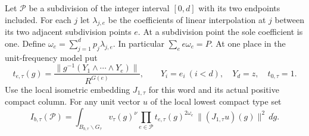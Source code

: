 \documentclass[a4paper,11pt]{article}
\theoremstyle{definition}
\theoremstyle{remark}
\numberwithin{equation}{section}
\begin{document}
Let \(\mathcal P\) be a subdivision of the integer interval
\([0,d]\) with its two endpoints included. For each \(j\) let
\(\lambda_{j,e}\) be the coefficients of linear interpolation at
\(j\) between its two adjacent subdivision points \(e\).
At a subdivision point the sole coefficient is one. Define
\(\omega_e=\sum_{j=1}^d p_j\lambda_{j,e}\). In particular
\(\sum_e e\omega_e=P\). At one place in the unit-frequency
model put
\[
 t_{e,\tau}(g)=
 \frac{\|g^{-1}(Y_1\wedge\cdots\wedge Y_e)\|}{R^{G(e)}},
 \qquad Y_i=e_i\ (i<d),\quad Y_d=z,\quad t_{0,\tau}=1 .
\]
Use the local isometric embedding \(J_{1,\tau}\) for this
word and its actual positive compact column. For any unit vector
\(u\) of the local lowest compact type set
\[
 I_{b,\tau}(\mathcal P)=
 \int_{B_{b,\tau}\backslash G_\tau}
       v_\tau(g)^\nu\prod_{e\in\mathcal P}
       t_{e,\tau}(g)^{2\omega_e}\,
       \|(J_{1,\tau}u)(g)\|^2\,d\dot g .
\]
\end{document}
